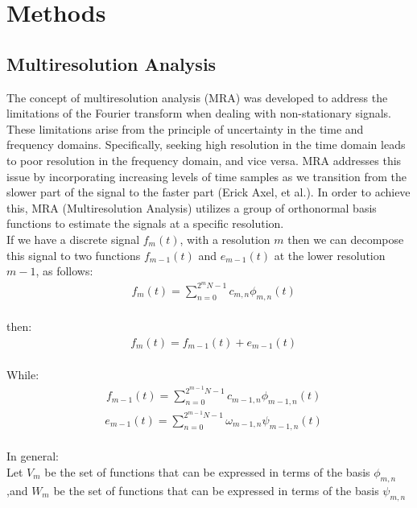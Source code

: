 \documentclass{svproc}
\begin{document}
\section{Methods}
\subsection{Multiresolution Analysis}
The concept of multiresolution analysis (MRA) was developed to address the
limitations of the Fourier transform when dealing with non-stationary signals.
These limitations arise from the principle of uncertainty in the time and
frequency domains. Specifically, seeking high resolution in the time domain
leads to poor resolution in the frequency domain, and vice versa. MRA addresses
this issue by incorporating increasing levels of time samples as we transition
from the slower part of the signal to the faster part (Erick Axel, et al.).
In order to achieve this, MRA (Multiresolution Analysis) utilizes a group of
orthonormal basis functions to estimate the signals at a specific resolution.\\


If we have a discrete signal $f_m(t)$, with a resolution $m$
then we can decompose this signal to two functions $f_{m-1}(t)$
and $e_{m-1}(t)$ at the lower resolution $m-1$, as follows:\\

\begin{equation}
  \begin{aligned}
     & f_m(t)=\sum_{n=0}^{2^m N-1} c_{m, n} \phi_{m, n}(t)
  \end{aligned}
  \label{eq:eq1}
\end{equation}\\
then:
\begin{equation}
  \begin{aligned}
     & f_m(t)=f_{m-1}(t)+ e_{m-1}(t)
  \end{aligned}
  \label{eq:eq2}
\end{equation}\\

While:
\begin{equation}
    \begin{aligned}
       & f_{m-1}(t)=\sum_{n=0}^{2^{m-1} N-1} c_{{m-1}, n} \phi_{{m-1}, n}(t)
    \end{aligned}
    \label{eq:eq3}
  \end{equation}
  \begin{equation}
    \begin{aligned}
       & e_{m-1}(t)=\sum_{n=0}^{2^{m-1} N-1} \omega_{{m-1}, n} \psi_{{m-1}, n}(t)
    \end{aligned}
    \label{eq:eq4}
  \end{equation}\\
In general:\\ 
Let $V_m$ be the set of functions that can be expressed in terms of the basis $\phi_{m,n}$\\
,and $W_m$ be the set of functions that can be expressed in terms of the basis $\psi_{m,n}$\\
\end{document}
